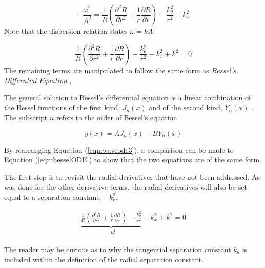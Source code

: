 \begin{equation}
    -\frac{\omega^2}{A^2}  = 
    \frac{1}{R}
    \left(      
    \frac{\partial^2 R}{\partial r^2 } +
    \frac{1}{r}\frac{\partial R}{\partial r}  
\right) -
    \frac{k_{\theta}^2}{r^2}-  
    k_x^2
    \label{eqn:waveode2}
\end{equation}
Note that the dispersion relation states $\omega = k A$

\begin{equation}
    \frac{1}{R}
    \left(      
    \frac{\partial^2 R}{\partial r^2 } +
    \frac{1}{r}\frac{\partial R}{\partial r}  
\right) -
    \frac{k_{\theta}^2}{r^2}-  
    k_x^2 + k^2 = 0
    \label{eqn:waveode3}
\end{equation}
The remaining terms are manipulated to follow the same form as \textit{Bessel's Differntial 
Equation} ,


The general solution to Bessel's differential equation is a linear combination of
the Bessel functions of the first kind, $J_n(x)$ and of the second kind, $Y_n(x)$ 
\cite{weisstein2002bessel}. The subscript $n$ refers to the order of Bessel's equation.

\begin{equation}
    y(x) = AJ_n(x) + BY_n(x)
    \label{eqn:besselsolution}
\end{equation}

By rearranging Equation (\ref{eqn:waveode3}), a comparison can be made to Equation
(\ref{eqn:besselODE}) to show that the two equations are of the same form. 

The first step is to revisit the radial derivatives that have not been addressed.
As was done for the other derivative terms, the radial derivatives will also 
be set equal to a separation constant, $-k_r^2$. 

\begin{align}
    \underbrace{\frac{1}{R}
    \left(      
    \frac{\partial^2 R}{\partial r^2 } +
    \frac{1}{r}\frac{\partial R}{\partial r}  
\right) -
    \frac{k_{\theta}^2}{r^2}}_{-k_r^2}-  
    k_x^2 + k^2 = 0
    \label{eqn:wavenumber_without_kr}
\end{align}

The reader may be curious as to why the tangential separation constant $k_{\theta}$ is 
included within the definition of the radial separation constant. 


